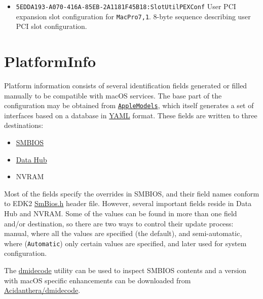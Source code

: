 \documentclass[]{article}
\makeatletter
\providecommand{\tightlist}{%
  \setlength{\itemsep}{0pt}\setlength{\parskip}{0pt}}
\renewcommand{\label}[1]{%
\zref@wrapper@immediate{\oldlabel{#1}}}  %
\makeatother
\begin{document}
\begin{itemize}
  Refer to the \href{https://support.apple.com/HT210104}{support page}
  for more details on how \texttt{MacPro7,1} slots are configured.

\item
  \texttt{5EDDA193-A070-416A-85EB-2A1181F45B18:SlotUtilPEXConf}
  \break
  User PCI expansion slot configuration for \texttt{MacPro7,1}.
  8-byte sequence describing user PCI slot configuration.

\end{itemize}

\section{PlatformInfo}\label{platforminfo}

Platform information consists of several identification fields
generated or filled manually to be compatible with macOS services. The
base part of the configuration may be obtained from
\href{https://github.com/acidanthera/MaxRegnerPkg/blob/master/AppleModels}{\texttt{AppleModels}},
which itself generates a set of interfaces based on a database
in \href{https://yaml.org/spec/1.2/spec.html}{YAML} format. These fields
are written to three destinations:

\begin{itemize}
\tightlist
\item
  \href{https://www.dmtf.org/standards/smbios}{SMBIOS}
\item
  \href{https://github.com/acidanthera/MaxRegnerPkg/blob/master/Include/Intel/Protocol/DataHub.h}{Data
  Hub}
\item
  NVRAM
\end{itemize}

Most of the fields specify the overrides in SMBIOS, and their field
names conform to EDK2
\href{https://github.com/acidanthera/audk/blob/master/MdePkg/Include/IndustryStandard/SmBios.h}{SmBios.h}
header file. However, several important fields reside in Data Hub and
NVRAM. Some of the values can be found in more than one field and/or
destination, so there are two ways to control their update process:
manual, where all the values are specified (the default), and semi-automatic,
where (\texttt{Automatic}) only certain values are specified, and later used
for system configuration.

The \href{http://www.nongnu.org/dmidecode}{dmidecode} utility can be used to inspect
SMBIOS contents and a version with macOS specific enhancements can be downloaded
from \href{https://github.com/acidanthera/dmidecode/releases}{Acidanthera/dmidecode}.
\end{document}
